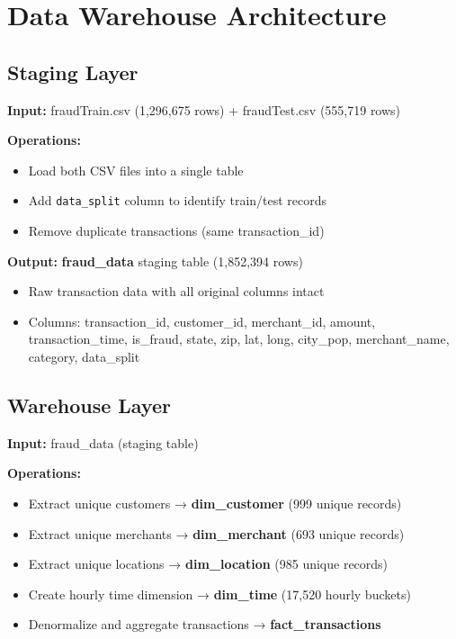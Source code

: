 \newpage

\section{Data Warehouse Architecture}

\subsection{Staging Layer}

\textbf{Input:} fraudTrain.csv (1,296,675 rows) + fraudTest.csv (555,719 rows)

\textbf{Operations:}
\begin{itemize}
    \item Load both CSV files into a single table
    \item Add \texttt{data\_split} column to identify train/test records
    \item Remove duplicate transactions (same transaction\_id)
\end{itemize}

\textbf{Output:} \textbf{fraud\_data} staging table (1,852,394 rows)
\begin{itemize}
    \item Raw transaction data with all original columns intact
    \item Columns: transaction\_id, customer\_id, merchant\_id, amount, transaction\_time, is\_fraud, state, zip, lat, long, city\_pop, merchant\_name, category, data\_split
\end{itemize}

\vspace{0.5cm}

\subsection{Warehouse Layer}

\textbf{Input:} fraud\_data (staging table)

\textbf{Operations:}
\begin{itemize}
    \item Extract unique customers → \textbf{dim\_customer} (999 unique records)
    \item Extract unique merchants → \textbf{dim\_merchant} (693 unique records)
    \item Extract unique locations → \textbf{dim\_location} (985 unique records)
    \item Create hourly time dimension → \textbf{dim\_time} (17,520 hourly buckets)
    \item Denormalize and aggregate transactions → \textbf{fact\_transactions}
\end{itemize}

